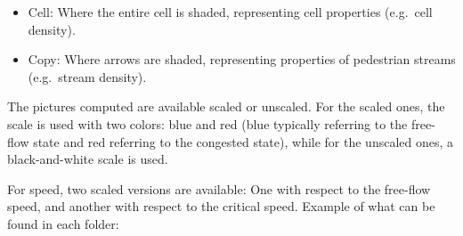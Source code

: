 \documentclass[a4paper,12pt]{article}
\begin{document}
\begin{itemize}
\item Cell: Where the entire cell is shaded, representing cell properties (e.g.\ cell density).
\item Copy: Where arrows are shaded, representing properties of pedestrian streams (e.g.\ stream density).
\end{itemize}
The pictures computed are available scaled or unscaled. For the scaled ones, the scale is used with two colors: blue and red (blue typically referring to the free-flow state and red referring to the congested state), while for the unscaled ones, a black-and-white scale is used.

For speed, two scaled versions are available: One with respect to the free-flow speed, and another with respect to the critical speed.
\newline\newline
Example of what can be found in each folder:
\end{document}
